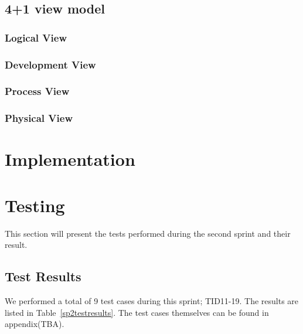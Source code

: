 \subsection{4+1 view model}
\subsubsection{Logical View}
\subsubsection{Development View}
\subsubsection{Process View}
\subsubsection{Physical View}

\section{Implementation}


\section{Testing}
This section will present the tests performed during the second sprint and their result.

\subsection{Test Results}
We performed a total of 9 test cases during this sprint; TID11-19. The results are listed in Table~\ref{sp2testresults}. The test cases themselves can be found in appendix(TBA).

